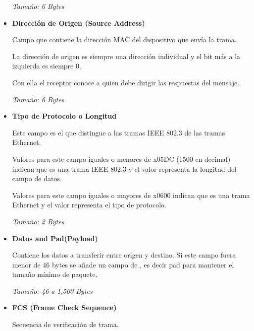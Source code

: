 \documentclass[12pt, fleqn]{report}                             %
\newcommand \Quote {\qq}                                        %
\theoremstyle{break}                                            %
\begin{document}
\begin{itemize}
                            \emph{Tamaño: 6 Bytes} 

                    \clearpage

                    \item
                        \textbf{Dirección de Origen (Source Address)}

                            Campo que contiene la dirección MAC del dispositivo que envía la trama.

                            La dirección de origen es siempre una dirección individual y el bit más a la izquierda es
                            siempre 0.

                            Con ella el receptor conoce a quien debe dirigir las respuestas del mensaje. 
                            
                            \emph{Tamaño: 6 Bytes} 

                    \item
                        \textbf{Tipo de Protocolo o Longitud}

                            Este campo es el que distingue a las tramas IEEE 802.3 de las tramas Ethernet. 

                            Valores para este campo iguales o menores de x05DC (1500 en decimal) indican que es una trama IEEE 802.3 y
                            el valor representa la longitud del campo de datos. 

                            Valores para este campo iguales o mayores de x0600 indican que es una trama Ethernet y el valor representa
                            el tipo de protocolo. 

                            \emph{Tamaño: 2 Bytes} 

                    \item
                        \textbf{Datos and Pad(Payload)}

                        Contiene los datos a transferir entre origen y destino.
                        Si este campo fuera menor de 46 bytes se añade un campo de \Quote{relleno}, es decir pad para mantener
                        el tamaño mínimo de paquete.

                        \emph{Tamaño: 46 a 1,500 Bytes} 


                    \item
                        \textbf{FCS (Frame Check Sequence)}

                        Secuencia de verificación de trama. 


\end{itemize}
\end{document}

